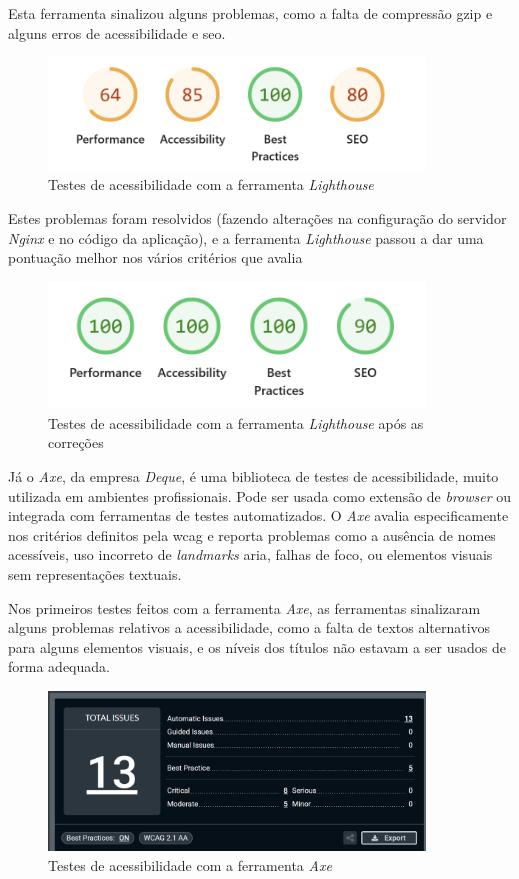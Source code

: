 Esta ferramenta sinalizou alguns problemas, como a falta de compressão \gls{gzip} e alguns erros de acessibilidade e \gls{seo}.

\begin{figure}[H]
\centering
\includegraphics[max width=10cm]{./img/lh_before}
\caption{Testes de acessibilidade com a ferramenta \textit{Lighthouse}}
\end{figure}

Estes problemas foram resolvidos (fazendo alterações na configuração do servidor \textit{Nginx} e no código da aplicação), e a ferramenta \textit{Lighthouse} passou a dar uma pontuação melhor nos vários critérios que avalia

\begin{figure}[H]
\centering
\includegraphics[max width=10cm]{./img/lh_after}
\caption{Testes de acessibilidade com a ferramenta \textit{Lighthouse} após as correções}
\end{figure}

Já o \textit{Axe}\cite{axe}, da empresa \textit{Deque}, é uma biblioteca de testes de acessibilidade, muito utilizada em ambientes profissionais. Pode ser usada como extensão de \textit{browser} ou integrada com ferramentas de testes automatizados. O \textit{Axe} avalia especificamente nos critérios definitos pela \gls{wcag} e reporta problemas como a ausência de nomes acessíveis, uso incorreto de \textit{landmarks} \gls{aria}, falhas de foco, ou elementos visuais sem representações textuais.

Nos primeiros testes feitos com a ferramenta \textit{Axe}, as ferramentas sinalizaram alguns problemas relativos a acessibilidade, como a falta de textos alternativos para alguns elementos visuais, e os níveis dos títulos não estavam a ser usados de forma adequada.


\begin{figure}[H]
    \centering
    \includegraphics[max width=10cm]{./img/axe}
    \caption{Testes de acessibilidade com a ferramenta \textit{Axe}}
    \end{figure}


